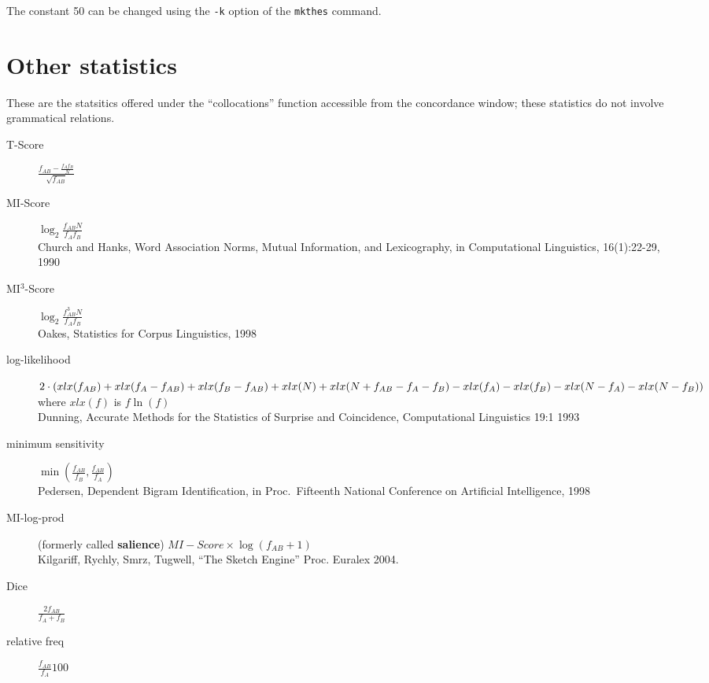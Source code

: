 \documentclass{article}
\begin{document}
The constant 50 can be changed using the \texttt{-k} option of the
\texttt{mkthes} command.


\section{Other statistics}

These are the statsitics offered under the ``collocations'' function accessible from the concordance window; these statistics do not involve grammatical relations.

\begin{description}
\item[T-Score] $\frac{f_{AB} - \frac{f_A  f_B}{N}}{\sqrt{f_{AB}}}$

\item[MI-Score] $\log_2 \frac{f_{AB}  N}{f_A  f_B}$
\\Church and Hanks, Word Association Norms,
 Mutual Information, and Lexicography, in Computational Linguistics,
 16(1):22-29, 1990

\item[MI$^3$-Score] $\log_2 \frac{f_{AB}^3  N}{f_A  f_B}$
\\Oakes, Statistics for Corpus Linguistics, 1998

\item[log-likelihood] $2 \cdot (xlx(f_{AB}) + xlx(f_A - f_{AB}) + xlx(f_B - f_{AB}) + xlx(N)\\
		+ xlx (N + f_{AB} - f_A - f_B)\\
		- xlx(f_A) - xlx(f_B) - xlx(N - f_A) - xlx(N - f_B)) $
\\where $xlx(f)$ is $ f  \ln (f)$
\\Dunning, Accurate Methods for the Statistics of Surprise and
 Coincidence, Computational Linguistics 19:1 1993

\item[minimum sensitivity] $ \min (\frac{f_{AB}}{f_B},\frac{f_{AB}}{f_A})$
\\Pedersen, Dependent Bigram Identification, in Proc.\
  Fifteenth National Conference on Artificial Intelligence, 1998


\item[MI-log-prod] (formerly called {\bf salience}) $ MI-Score \times \log (f_{AB} + 1)$
\\Kilgariff, Rychly, Smrz, Tugwell, ``The Sketch Engine'' Proc. Euralex 2004.


\item[Dice] $ \frac{2 f_{AB}}{f_A + f_B} $

\item[relative freq] $ \frac{f_{AB}}{f_A} 100$
\end{description}
\end{document}
